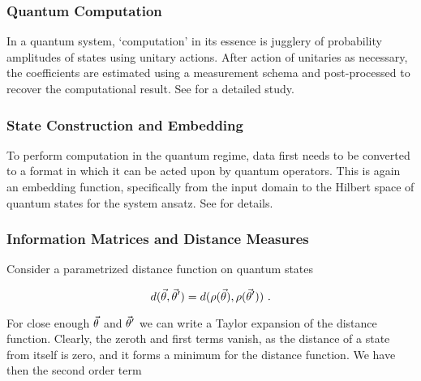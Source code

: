 

\subsubsection{Quantum Computation}
In a quantum system, `computation' in its essence is jugglery of probability
amplitudes of states using unitary actions. After action of unitaries as
necessary, the coefficients are estimated using a measurement schema and
post-processed to recover the computational result. See
\cite{nielsen2002quantum} for a detailed study.

\subsubsection{State Construction and Embedding}
To perform computation in the quantum regime, data first needs to be converted
to a format in which it can be acted upon by quantum operators. This is again an
embedding function, specifically from the input domain to the Hilbert space of
quantum states for the system ansatz. See \cite{lloyd2020quantum} for details.

\subsubsection{Information Matrices and Distance Measures}
\label{subsubsec:distanceinfo}

Consider a parametrized distance function on quantum states 

\begin{equation}
    d(\vec{\theta}, \vec{\theta}') = d(\rho(\vec{\theta}), \rho(\vec{\theta}'))~.
\end{equation}

For close enough \(\vec{\theta}\) and \(\vec{\theta}'\) we can write a Taylor
expansion of the distance function. Clearly, the zeroth and first terms vanish,
as the distance of a state from itself is zero, and it forms a minimum for the
distance function. We have then the second order term

